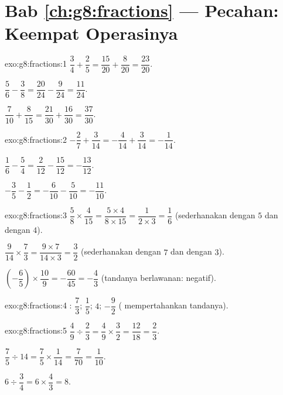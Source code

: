 \section*{Bab \ref{ch:g8:fractions} --- Pecahan: Keempat Operasinya}

\begin{solution}{exo:g8:fractions:1}
$\dfrac34 + \dfrac25 = \dfrac{15}{20} + \dfrac{8}{20} =
\dfrac{23}{20}$.

$\dfrac56 - \dfrac38 = \dfrac{20}{24} - \dfrac{9}{24} =
\dfrac{11}{24}$.

$\dfrac{7}{10} + \dfrac{8}{15} = \dfrac{21}{30} + \dfrac{16}{30} =
\dfrac{37}{30}$.
\end{solution}

\begin{solution}{exo:g8:fractions:2}
$-\dfrac27 + \dfrac{3}{14} = -\dfrac{4}{14} + \dfrac{3}{14} =
-\dfrac{1}{14}$.

$\dfrac16 - \dfrac54 = \dfrac{2}{12} - \dfrac{15}{12} =
-\dfrac{13}{12}$.

$-\dfrac35 - \dfrac12 = -\dfrac{6}{10} - \dfrac{5}{10} =
-\dfrac{11}{10}$.
\end{solution}

\begin{solution}{exo:g8:fractions:3}
$\dfrac58 \times \dfrac{4}{15} = \dfrac{5 \times 4}{8 \times 15}
= \dfrac{1}{2 \times 3} = \dfrac16$ (sederhanakan dengan $5$ dan dengan $4$).

$\dfrac{9}{14} \times \dfrac73 = \dfrac{9 \times 7}{14 \times 3}
= \dfrac{3}{2}$ (sederhanakan dengan $7$ dan dengan $3$).

$\left(-\dfrac65\right) \times \dfrac{10}{9} = -\dfrac{60}{45}
= -\dfrac43$ (tandanya berlawanan: negatif).
\end{solution}

\begin{solution}{exo:g8:fractions:4}
: $\dfrac73$; \quad $\dfrac15$; \quad $4$; \quad
$-\dfrac92$ ( mempertahankan tandanya).
\end{solution}

\begin{solution}{exo:g8:fractions:5}
$\dfrac49 \div \dfrac23 = \dfrac49 \times \dfrac32 = \dfrac{12}{18}
= \dfrac23$.

$\dfrac75 \div 14 = \dfrac75 \times \dfrac{1}{14} = \dfrac{7}{70}
= \dfrac{1}{10}$.

$6 \div \dfrac34 = 6 \times \dfrac43 = 8$.
\end{solution}

